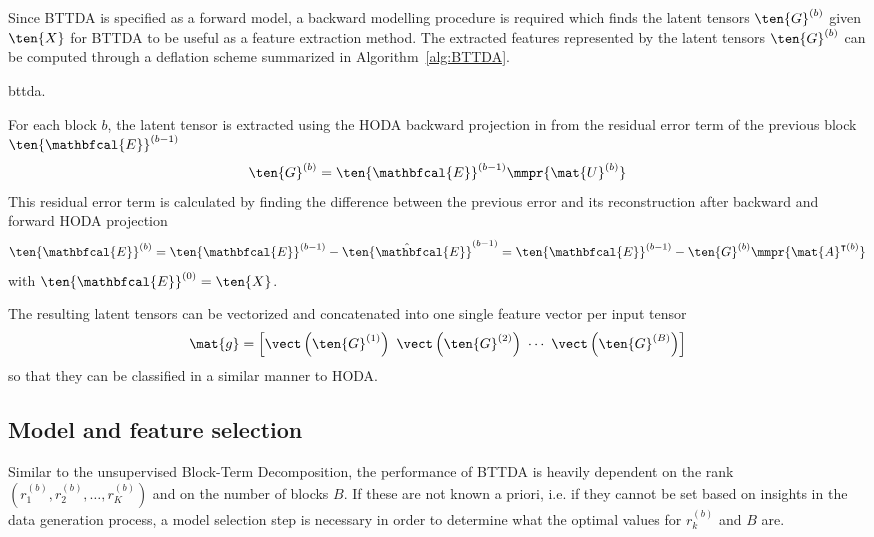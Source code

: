 Since BTTDA is specified as a forward model, a backward modelling
procedure is required which finds the latent tensors $\ten{G}^{(b)}$ given $\ten{X}$ for
BTTDA to be useful as a feature extraction method.
The extracted features represented by the latent tensors $\ten{G}^{(b)}$ can be
computed through a deflation scheme summarized in Algorithm~\ref{alg:BTTDA}.
\begin{algorithm}
  \caption{\Ac{bttda}.}
	\label{alg:BTTDA}
	
\end{algorithm}
For each block $b$, the latent tensor is extracted using the HODA backward
projection in  from the residual error term of the previous
block $\ten{\mathbfcal{E}}^{(b-1)}$
\begin{equation}
	\ten{G}^{(b)} = \ten{\mathbfcal{E}}^{(b-1)}\mmpr{\mat{U}^{(b)}}
\end{equation}
This residual error term is calculated by finding the difference between the
previous error and its reconstruction after backward and forward HODA
projection
\begin{equation}
  \ten{\mathbfcal{E}}^{(b)}
  = \ten{\mathbfcal{E}}^{(b-1)} - \hat{\ten{\mathbfcal{E}}}^{(b-1)}
  = \ten{\mathbfcal{E}}^{(b-1)} - \ten{G}^{(b)}\mmpr{\mat{A}^{\intercal(b)}}
\end{equation}
with $\ten{\mathbfcal{E}}^{(0)}=\ten{X}$.

The resulting latent tensors can be vectorized and concatenated into
one single feature vector per input tensor
\begin{equation}
	\mat{g}
	=\left[\vect\left(\ten{G}^{(1)}\right)\
		\vect\left(\ten{G}^{(2)}\right)\
		\cdots\
		\vect\left(\ten{G}^{(B)}\right)\right]
\end{equation}
so that they can be classified in a similar manner to HODA.


\subsection{Model and feature selection}
Similar to the unsupervised Block-Term Decomposition, the performance of BTTDA is
heavily dependent on the rank $(r_1^{(b)}, r_2^{(b)}, \ldots,
	r_K^{(b)})$ and on the number of blocks $B$.
If these are not known a priori, i.e. if they cannot be set based on insights in the
data generation process, a model selection step is necessary in order to
determine what the optimal values for $r_k^{(b)}$ and $B$ are.

